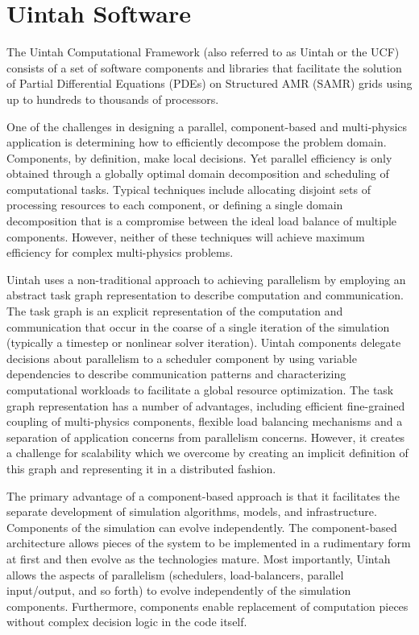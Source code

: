 \section{Uintah Software}

The Uintah Computational Framework (also referred to as Uintah or the UCF)
consists of a set of software components and libraries that facilitate
the solution of Partial Differential Equations (PDEs) on Structured
AMR (SAMR) grids using up to hundreds to thousands of processors.

One of the challenges in designing a parallel, component-based and
multi-physics application is determining how to efficiently decompose
the problem domain. Components, by definition, make local
decisions. Yet parallel efficiency is only obtained through a globally
optimal domain decomposition and scheduling of computational
tasks. Typical techniques include allocating disjoint sets of
processing resources to each component, or defining a single domain
decomposition that is a compromise between the ideal load balance of
multiple components. However, neither of these techniques will achieve
maximum efficiency for complex multi-physics problems.

Uintah uses a non-traditional approach to achieving parallelism by
employing an abstract task graph representation to describe
computation and communication. The task graph is an explicit
representation of the computation and communication that occur in the
coarse of a single iteration of the simulation (typically a timestep
or nonlinear solver iteration). Uintah components delegate decisions
about parallelism to a scheduler component by using variable
dependencies to describe communication patterns and characterizing
computational workloads to facilitate a global resource
optimization. The task graph representation has a number of
advantages, including efficient fine-grained coupling of multi-physics
components, flexible load balancing mechanisms and a separation of
application concerns from parallelism concerns. However, it creates a
challenge for scalability which we overcome by creating an implicit
definition of this graph and representing it in a distributed fashion.


The primary advantage of a component-based approach is that it
facilitates the separate development of simulation algorithms, models,
and infrastructure. Components of the simulation can evolve
independently. The component-based architecture allows pieces of the
system to be implemented in a rudimentary form at first and then
evolve as the technologies mature. Most importantly, Uintah allows the
aspects of parallelism (schedulers, load-balancers, parallel
input/output, and so forth) to evolve independently of the simulation
components. Furthermore, components enable replacement of computation
pieces without complex decision logic in the code itself.

